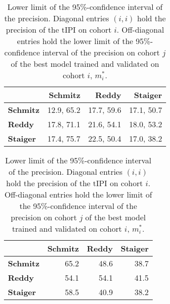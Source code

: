 \begin{table}
    \centering
    \begin{subtable}{\textwidth}
        \centering
        \begin{tabular}{lrrr}
            \hline
            & \textbf{Schmitz} & \textbf{Reddy} & \textbf{Staiger} \\
            \hline
            \textbf{Schmitz} & \num{12.9}, \num{65.2} & \num{17.7}, \num{59.6} & \num{17.1}, \num{50.7} \\
            \textbf{Reddy} & \num{17.8}, \num{71.1} & \num{21.6}, \num{54.1} & \num{18.0}, \num{53.2} \\
            \textbf{Staiger} & \num{17.4}, \num{75.7} & \num{22.5}, \num{50.4} & \num{17.0}, \num{38.2} \\
            \hline
        \end{tabular}
        \caption{Prevalence and precision.
            Diagonal entries $(i, i)$ hold prevalence, precision of the $\text{tIPI}$ on 
            cohort $i$. Off-diagonal entries $(i, j)$ hold prevalence, precision on cohort $j$ of 
            the best model trained and validated on cohort $i$, $m_i^*$.}\label{subtab:inter-prev-prec}
    \end{subtable}

    \vspace{0.5cm}
    \begin{subtable}{\textwidth}
        \centering
        \begin{tabular}{lrrr}
            \hline
            & \textbf{Schmitz} & \textbf{Reddy} & \textbf{Staiger} \\
            \hline
            \textbf{Schmitz} & \num{65.2} & \num{48.6} & \num{38.7} \\
            \textbf{Reddy} & \num{54.1} & \num{54.1} & \num{41.5} \\
            \textbf{Staiger} & \num{58.5} & \num{40.9} & \num{38.2} \\
            \hline
        \end{tabular}
        \caption{Lower limit of the \num{95}\%-confidence interval of the precision.
            Diagonal entries $(i, i)$ hold the precision of the $\text{tIPI}$ on cohort $i$. 
            Off-diagonal entries hold the lower limit of the \num{95}\%-confidence interval of the 
            precision on cohort $j$ of the best model trained and validated on cohort $i$, $m_i^*$.}
            \label{subtab:inter-prec-ci}
    \end{subtable}


\end{table}
